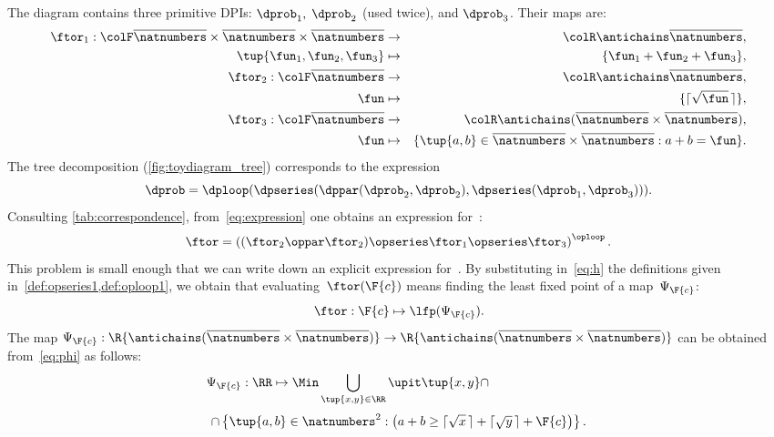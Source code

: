 The diagram contains three primitive DPIs: $\dprob_{1},$
$\dprob_{2}$ (used twice), and $\dprob_{3}$. Their \ftor maps
are:
\begin{eqnarray*}
    \ftor_{1}:{\colF\overline{\natnumbers}\times\overline{\natnumbers}\times\overline{\natnumbers}} & \rightarrow & {\colR\antichains\overline{\natnumbers}},\\
    \tup{ \fun_{1},\fun_{2},\fun_{3}}  & \mapsto & \{\fun_{1}+\fun_{2}+\fun_{3}\},\\
    \ftor_{2}:{\colF\overline{\natnumbers}} & \rightarrow & {\colR\antichains\overline{\natnumbers}},\\
    \fun& \mapsto & \{\lceil\sqrt{\fun}\,\rceil\},\\
    \ftor_{3}:{\colF\overline{\natnumbers}} & \rightarrow & {\colR\antichains(\overline{\natnumbers}\times\overline{\natnumbers})},\\
    \fun& \mapsto & \{\tup{ a,b} \in\overline{\natnumbers}\times\overline{\natnumbers}:a+b=\fun\}.
\end{eqnarray*}
The tree decomposition (\cref{fig:toydiagram_tree}) corresponds to
the expression
\begin{equation}
    \dprob=\dploop(\dpseries(\dppar(\dprob_{2},\dprob_{2}),\dpseries(\dprob_{1},\dprob_{3}))).\label{eq:expression}
\end{equation}
Consulting \cref{tab:correspondence}, from~\cref{eq:expression}
one obtains an expression for~\ftor:
\begin{equation}
    \ftor=\left((\ftor_{2}\oppar\ftor_{2})\opseries\ftor_{1}\opseries\ftor_{3}\right)^{\oploop}.\label{eq:h}
\end{equation}
This problem is small enough that we can write down an explicit expression
for~\ftor. By substituting in~\cref{eq:h} the definitions given in~\cref{def:opseries1,def:oploop1}, we obtain that
evaluating~$\ftor(\F{c})$ means finding the least fixed point of a map~$\Psi_{\F{c}}$:
\[
    \ftor:\F{c}\mapsto\lfp(\Psi_{\F{c}}).
\]
The map $\Psi_{\F{c}}:\R{\antichains(\overline{\natnumbers}\times\overline{\natnumbers})}\rightarrow\R{\antichains(\overline{\natnumbers}\times\overline{\natnumbers})}$
can be obtained from~\cref{eq:phi} as follows:
\begin{equation}
    \Psi_{\F{c}}:\RR\mapsto\Min\bigcup_{\tup{ x,y} \in\RR}\upit\tup{ x,y} \cap\qquad\qquad\qquad\qquad
\end{equation}
\begin{equation}
    \cap\left\{ \tup{ a,b} \in\natnumbers^{2}:\left(a+b\geq\lceil\sqrt{x}\,\rceil+\lceil\sqrt{y}\,\rceil+\F{c}\right)\right\}.
\end{equation}

